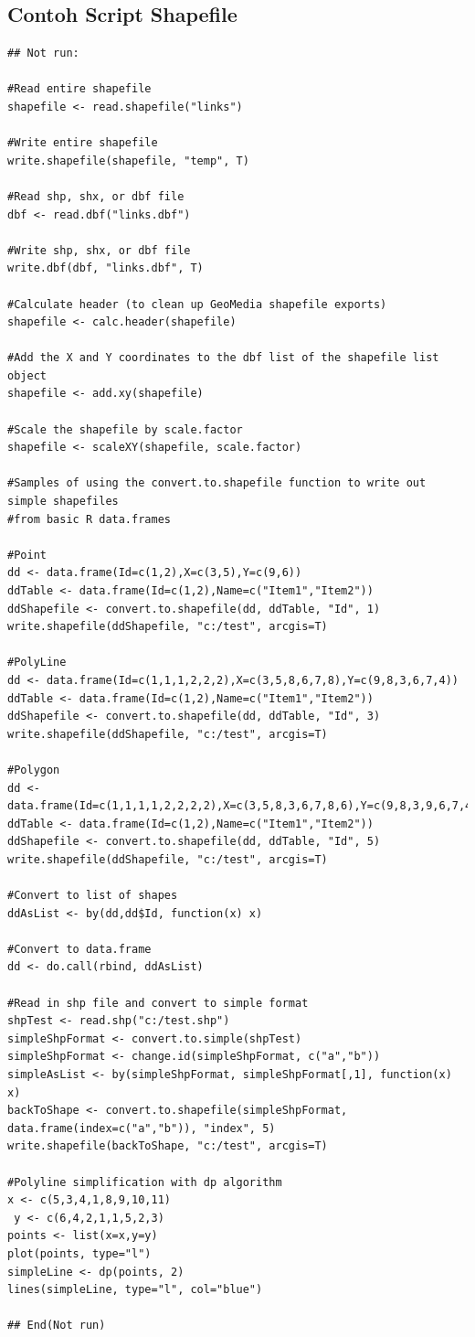 \subsection{Contoh Script Shapefile}
\begin{Verbatim}
## Not run: 

#Read entire shapefile 
shapefile <- read.shapefile("links") 

#Write entire shapefile 
write.shapefile(shapefile, "temp", T) 

#Read shp, shx, or dbf file 
dbf <- read.dbf("links.dbf") 

#Write shp, shx, or dbf file 
write.dbf(dbf, "links.dbf", T) 

#Calculate header (to clean up GeoMedia shapefile exports) 
shapefile <- calc.header(shapefile) 

#Add the X and Y coordinates to the dbf list of the shapefile list object 
shapefile <- add.xy(shapefile)

#Scale the shapefile by scale.factor 
shapefile <- scaleXY(shapefile, scale.factor) 

#Samples of using the convert.to.shapefile function to write out simple shapefiles 
#from basic R data.frames 

#Point 
dd <- data.frame(Id=c(1,2),X=c(3,5),Y=c(9,6)) 
ddTable <- data.frame(Id=c(1,2),Name=c("Item1","Item2")) 
ddShapefile <- convert.to.shapefile(dd, ddTable, "Id", 1) 
write.shapefile(ddShapefile, "c:/test", arcgis=T) 

#PolyLine 
dd <- data.frame(Id=c(1,1,1,2,2,2),X=c(3,5,8,6,7,8),Y=c(9,8,3,6,7,4)) 
ddTable <- data.frame(Id=c(1,2),Name=c("Item1","Item2")) 
ddShapefile <- convert.to.shapefile(dd, ddTable, "Id", 3) 
write.shapefile(ddShapefile, "c:/test", arcgis=T) 

#Polygon 
dd <- data.frame(Id=c(1,1,1,1,2,2,2,2),X=c(3,5,8,3,6,7,8,6),Y=c(9,8,3,9,6,7,4,6)) 
ddTable <- data.frame(Id=c(1,2),Name=c("Item1","Item2")) 
ddShapefile <- convert.to.shapefile(dd, ddTable, "Id", 5) 
write.shapefile(ddShapefile, "c:/test", arcgis=T)

#Convert to list of shapes 
ddAsList <- by(dd,dd$Id, function(x) x) 

#Convert to data.frame 
dd <- do.call(rbind, ddAsList) 

#Read in shp file and convert to simple format 
shpTest <- read.shp("c:/test.shp") 
simpleShpFormat <- convert.to.simple(shpTest) 
simpleShpFormat <- change.id(simpleShpFormat, c("a","b")) 
simpleAsList <- by(simpleShpFormat, simpleShpFormat[,1], function(x) x) 
backToShape <- convert.to.shapefile(simpleShpFormat, 
data.frame(index=c("a","b")), "index", 5) 
write.shapefile(backToShape, "c:/test", arcgis=T) 

#Polyline simplification with dp algorithm 
x <- c(5,3,4,1,8,9,10,11)
 y <- c(6,4,2,1,1,5,2,3) 
points <- list(x=x,y=y) 
plot(points, type="l") 
simpleLine <- dp(points, 2) 
lines(simpleLine, type="l", col="blue") 

## End(Not run) 
\end{Verbatim} \cite{stabler2006shapefiles}

